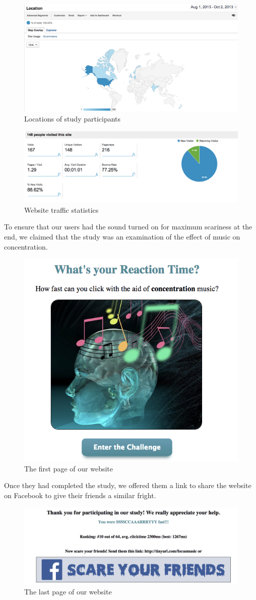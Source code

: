 \documentclass[10pt,a4paper]{article}
\begin{document}
\begin{figure}
\includegraphics[width=\linewidth]{cmdmaps_location.png}
\caption{Locations of study participants}
\end{figure}
\begin{figure}
\includegraphics[width=\linewidth]{cmdmaps_stats.png} 
\caption{Website traffic statistics}
\end{figure}

To ensure that our users had the sound turned on for maximum scariness at the end, we claimed that the study was an examination of the effect of music on concentration.
\begin{figure}
\centering
\includegraphics[width=.5\linewidth]{frontpage.png} 
\caption{The first page of our website}
\end{figure}
Once they had completed the study, we offered them a link to share the website on Facebook to give their friends a similar fright.

\begin{figure}
\centering
\includegraphics[width=\linewidth]{finish.png} 
\caption{The last page of our website}
\end{figure}
\end{document}
